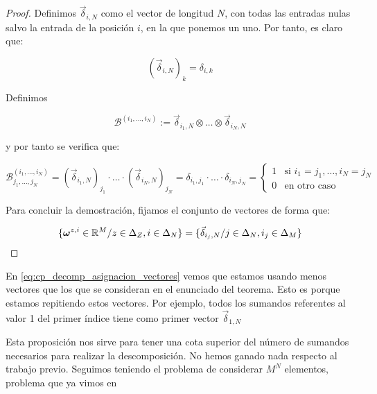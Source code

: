 \begin{proof}
    Definimos $\vec{\delta}_{i, N}$ como el vector de longitud $N$, con todas las entradas nulas salvo la entrada de la posición $i$, en la que ponemos un uno. Por tanto, es claro que:

    \begin{equation}
        (\vec{\delta}_{i, N})_k =  \delta_{i, k}
    \end{equation}

    Definimos

    \begin{equation}
        \mathcal{B}^{(i_1, \ldots, i_N)} := \vec{\delta}_{i_1, N} \otimes \ldots \otimes \vec{\delta}_{i_N, N}
    \end{equation}

    y por tanto se verifica que:

    \begin{equation}
        \mathcal{B}^{(i_1, \ldots, i_N)}_{j_1, \ldots, j_N} = (\vec{\delta}_{i_1, N})_{j_1} \cdot \ldots \cdot (\vec{\delta}_{i_N, N})_{j_N} = \delta_{i_1, j_1} \cdot \ldots \cdot \delta_{i_N, j_N} =
        \begin{cases}
            1 & \text{si } i_1 = j_1, \ldots, i_N = j_N \\
            0 & \text{en otro caso}
        \end{cases}
    \end{equation}

    Para concluir la demostración, fijamos el conjunto de vectores de forma que:

    \begin{equation} \label{eq:cp_decomp_asignacion_vectores}
        \{\boldsymbol{\omega}^{z, i} \in \mathbb{R}^M / z \in \Delta_{Z}, i \in \Delta_{N} \} =
        \{ \vec{\delta}_{i_j, N} / j \in \Delta_{N}, i_j \in \Delta_{M} \}
    \end{equation}

\end{proof}

\begin{observacion}
    En \eqref{eq:cp_decomp_asignacion_vectores} vemos que estamos usando menos vectores que los que se consideran en el enunciado del teorema. Esto es porque estamos repitiendo estos vectores. Por ejemplo, todos los sumandos referentes al valor 1 del primer índice tiene como primer vector $\vec{\delta}_{1, N}$
\end{observacion}

\begin{observacion}
    Esta proposición nos sirve para tener una cota superior del número de sumandos necesarios para realizar la descomposición. No hemos ganado nada respecto al trabajo previo. Seguimos teniendo el problema de considerar $M^N$ elementos, problema que ya vimos en 
\end{observacion}

\endinput
